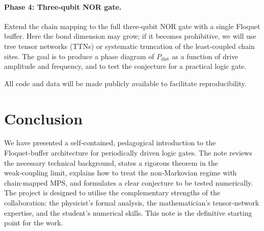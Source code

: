 \documentclass[11pt,a4paper]{article}
\theoremstyle{definition}
\theoremstyle{remark}
\begin{document}
\paragraph{Phase 4: Three‑qubit NOR gate.}
Extend the chain mapping to the full three‑qubit NOR gate with a single Floquet buffer. Here the bond dimension may grow; if it becomes prohibitive, we will use tree tensor networks (TTNs) or systematic truncation of the least‑coupled chain sites. The goal is to produce a phase diagram of $P_{\text{dist}}$ as a function of drive amplitude and frequency, and to test the conjecture for a practical logic gate.

All code and data will be made publicly available to facilitate reproducibility.

\section{Conclusion}
We have presented a self‑contained, pedagogical introduction to the Floquet‑buffer architecture for periodically driven logic gates. The note reviews the necessary technical background, states a rigorous theorem in the weak‑coupling limit, explains how to treat the non‑Markovian regime with chain‑mapped MPS, and formulates a clear conjecture to be tested numerically. The project is designed to utilise the complementary strengths of the collaboration: the physicist’s formal analysis, the mathematician’s tensor‑network expertise, and the student’s numerical skills. This note is the definitive starting point for the work.
\end{document}
